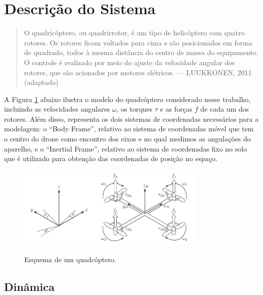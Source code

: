 \section{Descrição do Sistema}
\begin{quote}
    O quadricóptero, ou quadrirrotor, é um tipo de helicóptero com quatro rotores. Os rotores ficam 
    voltados para cima e são posicionados em forma de quadrado, todos à mesma distância do centro de 
    massa do equipamento. O controle é realizado por meio do ajuste da velocidade angular dos rotores, 
    que são acionados por motores elétricos. — LUUKKONEN, 2011 \cite{luukkonen} (adaptado)
\end{quote}

A Figura \ref{fig:modelo} abaixo ilustra o modelo do quadcóptero considerado nesse trabalho, incluindo 
as velocidades angulares $\omega$, os torques $\tau$ e as forças $f$ de cada um dos rotores. Além disso, 
representa os dois sistemas de coordenadas necessários para a modelagem: o ``Body Frame'', relativo ao 
sistema de coordenadas móvel que tem o centro do drone como encontro dos eixos e no qual medimos as angulações 
do aparelho, e o ``Inertial Frame'', relativo ao sistema de coordenadas fixo no solo que é utilizado para 
obtenção das coordenadas de posição no espaço.

\begin{figure}[h!]
    \centering
    \caption{Esquema de um quadcóptero. \cite{luukkonen}}
    \includegraphics[width=0.8\textwidth]{figs/desenho_drone.png}
    \label{fig:modelo}
\end{figure}

\subsection{Dinâmica}

